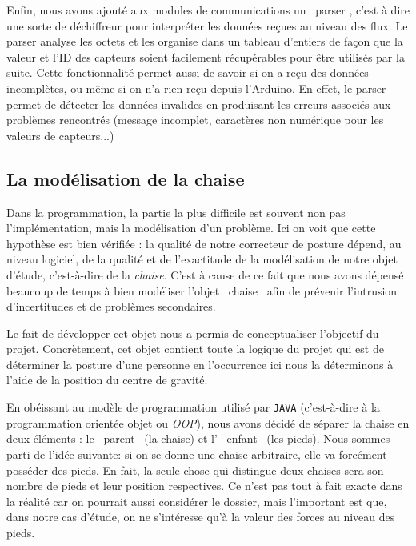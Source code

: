 \documentclass{polytech/polytech}
\begin{document}
Enfin, nous avons ajouté aux modules de communications un \guillemotleft\ parser \guillemotright , c'est à dire une sorte de déchiffreur pour interpréter les données reçues au niveau des flux.
 Le parser analyse les octets et les organise dans un tableau d'entiers de façon que la valeur et l'ID des capteurs soient facilement récupérables pour être utilisés par la suite.
Cette fonctionnalité permet aussi de savoir si on a reçu des données incomplètes, ou même si on n'a rien reçu depuis l'Arduino. En effet, le parser permet de détecter les données invalides en produisant les erreurs associés aux problèmes rencontrés (message incomplet, caractères non numérique pour les valeurs de capteurs...)


\subsection{La modélisation de la chaise}
\label{subsec:model_chaise}
Dans la programmation, la partie la plus difficile est souvent non pas l'implémentation, mais la modélisation d'un problème. Ici on voit que cette hypothèse est bien vérifiée : la qualité de notre correcteur de posture dépend, au niveau logiciel, de la qualité et de l'exactitude de la modélisation de notre objet d'étude, c'est-à-dire de la \textit{chaise}. C'est à cause de ce fait que nous avons dépensé beaucoup de temps à bien modéliser l'objet \guillemotleft\ chaise \guillemotright\ afin de prévenir l'intrusion d'incertitudes et de problèmes secondaires.

Le fait de développer cet objet nous a permis de conceptualiser l'objectif du projet. Concrètement, cet objet contient toute la logique du projet qui est de déterminer la posture d'une personne en l'occurrence ici nous la déterminons à l'aide de la position du centre de gravité.

En obéissant au modèle de programmation utilisé par \texttt{JAVA} (c'est-à-dire à la programmation orientée objet ou \textit{OOP}), nous avons décidé de séparer la chaise en deux éléments : le \guillemotleft\ parent \guillemotright\ (la chaise) et l' \guillemotleft\ enfant \guillemotright\ (les pieds).
Nous sommes parti de l'idée suivante: si on se donne une chaise arbitraire, elle va forcément posséder des pieds. En fait, la seule chose qui distingue deux chaises sera son nombre de pieds et leur position respectives. Ce n'est pas tout à fait exacte dans la réalité car on pourrait aussi considérer le dossier, mais l'important est que, dans notre cas d'étude, on ne s'intéresse qu'à la valeur des forces au niveau des pieds.
\end{document}
